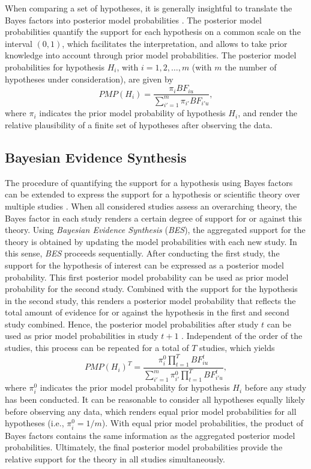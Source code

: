 \documentclass[
  authoryear,
  preprint,
  5p,
  twocolumn]{elsarticle}
\begin{document}
When comparing a set of hypotheses, it is generally insightful to
translate the Bayes factors into posterior model probabilities
\citep[\(PMP\)s;][]{kass_raftery_bayes_factors_1995}. The posterior
model probabilities quantify the support for each hypothesis on a common
scale on the interval \((0,1)\), which facilitates the interpretation,
and allows to take prior knowledge into account through prior model
probabilities. The posterior model probabilities for hypothesis \(H_i\),
with \(i = 1, 2, \dots, m\) (with \(m\) the number of hypotheses under
consideration), are given by \[
PMP(H_{i}) = \frac{\pi_i BF_{iu}}{\sum^m_{i'=1} \pi_{i'} BF_{i'u}}, 
\] where \(\pi_i\) indicates the prior model probability of hypothesis
\(H_i\), and render the relative plausibility of a finite set of
hypotheses after observing the data.

\hypertarget{bayesian-evidence-synthesis}{%
\subsection{Bayesian Evidence
Synthesis}\label{bayesian-evidence-synthesis}}

The procedure of quantifying the support for a hypothesis using Bayes
factors can be extended to express the support for a hypothesis or
scientific theory over multiple studies \citep{kuiper_combining_2013}.
When all considered studies assess an overarching theory, the Bayes
factor in each study renders a certain degree of support for or against
this theory. Using \emph{Bayesian Evidence Synthesis} (\emph{BES}), the
aggregated support for the theory is obtained by updating the model
probabilities with each new study. In this sense, \emph{BES} proceeds
sequentially. After conducting the first study, the support for the
hypothesis of interest can be expressed as a posterior model
probability. This first posterior model probability can be used as prior
model probability for the second study. Combined with the support for
the hypothesis in the second study, this renders a posterior model
probability that reflects the total amount of evidence for or against
the hypothesis in the first and second study combined. Hence, the
posterior model probabilities after study \(t\) can be used as prior
model probabilities in study \(t + 1\) \citep{kuiper_combining_2013}.
Independent of the order of the studies, this process can be repeated
for a total of \(T\) studies, which yields \[
PMP(H_i)^T = \frac{\pi^0_{i} \prod^T_{t=1} BF^t_{iu}}{\sum^m_{i'=1} \pi^0_{i'} \prod^T_{t=1} BF^t_{i'u}},
\] where \(\pi^0_i\) indicates the prior model probability for
hypothesis \(H_i\) before any study has been conducted. It can be
reasonable to consider all hypotheses equally likely before observing
any data, which renders equal prior model probabilities for all
hypotheses (i.e., \(\pi^0_i = 1/m\)). With equal prior model
probabilities, the product of Bayes factors contains the same
information as the aggregated posterior model probabilities. Ultimately,
the final posterior model probabilities provide the relative support for
the theory in all studies simultaneously.
\end{document}
